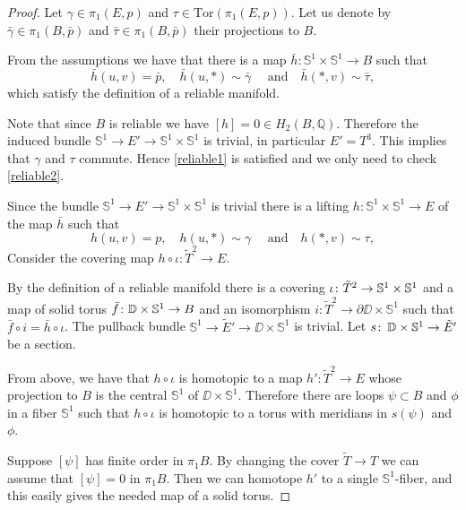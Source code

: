 \documentclass{amsart}
\begin{document}
\begin{proof}
Let $\gamma\in \pi_1(E,p)$ and $\tau\in \mathrm{Tor}(\pi_1(E,p))$. 
Let us denote by $\bar\gamma\in \pi_1(B,\bar p)$ and 
$\bar\tau\in \pi_1(B,\bar p)$ their projections to $B$.

From the assumptions we have 
that there is a map 
$\bar h\colon \mathbb{S}^1\times \mathbb{S}^1\to B$ such that 
$$\bar h(u,v)=\bar p,\quad
\bar h(u,*)\sim\bar\gamma\quad\text{ and}\quad
\bar h(*,v)\sim\bar\tau,$$
which satisfy the definition of a reliable manifold.

Note that since $B$ is reliable we have $[h]=0\in H_2(B,\mathbb{Q})$. Therefore the induced bundle $\mathbb{S}^1\to E'\to \mathbb{S}^1\times \mathbb{S}^1$ is trivial, in particular $E'=T^3$. This  implies that $\gamma$ and $\tau$ commute. Hence \eqref{reliable1} is satisfied and we only need to check \eqref{reliable2}.

Since the bundle  $\mathbb{S}^1\to E'\to \mathbb{S}^1\times \mathbb{S}^1$ is trivial there is a lifting $h\colon \mathbb{S}^1\times \mathbb{S}^1\to E$ of the map $\bar h$ such that
$$ h(u,v)= p,\quad
 h(u,*)\sim\gamma\quad\text{ and}\quad
 h(*,v)\sim\tau,$$
Consider the covering map $h\circ\iota\colon \tilde T^2\to E$.

By the definition of a reliable manifold there is a covering $\iota\colon \tilde T^2\z\to \mathbb{S}^1\times \mathbb{S}^1$ and a map of solid torus $\bar f\colon \DD\times \mathbb{S}^1\z\to B$ and an isomorphism $i\colon \tilde T^2\to \partial \DD\times \mathbb{S}^1$ such that $\bar f\circ i=\bar h\circ\iota$. The pullback bundle $\mathbb{S}^1\to \tilde E'\to \DD\times \mathbb{S}^1$ is trivial. Let $s\colon\thinspace  \mathbb{D}\times \mathbb{S}^1\to  \tilde E'$ be a section.

From above, we have that $h\circ\iota$ is homotopic to a map
$h'\colon \tilde T^2\to E$ whose projection to $B$ is the central $\mathbb{S}^1$ of 
$\DD\times \mathbb{S}^1$. 
Therefore there are loops $\psi\subset B$ and $\phi$ in a fiber $\mathbb{S}^1$  such that $h\circ\iota$ is homotopic to a torus with meridians in $s(\psi)$ and $\phi$.

Suppose 
$[\psi]$ has finite order in $\pi_1B$. By changing the cover $\tilde T\to T$ we can assume that $[\psi]=0$  in $\pi_1B$.
Then we can homotope $h'$ to a single $\mathbb{S}^1$-fiber, and this easily gives the needed map of  a solid torus.


\end{proof}
\end{document}
